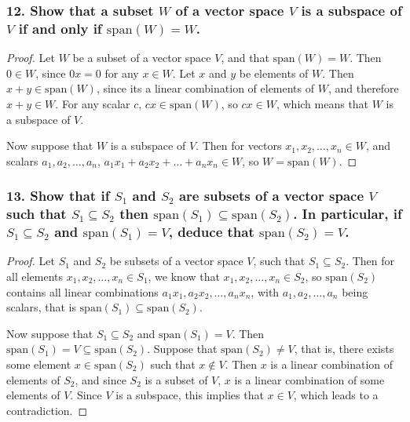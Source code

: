 \documentclass{article}
\begin{document}
\subsubsection*{12. Show that a subset $W$ of a vector space $V$ is a subspace of $V$ if and only if $\text{span}(W) = W$.}
\begin{proof}
	Let $W$ be a subset of a vector space $V$, and that $\text{span}(W) = W$. Then $0 \in W$, since $0x = 0$ for any $x \in W$. Let $x$ and $y$ be elements of $W$. Then $x + y \in \text{span}(W)$, since its a linear combination of elements of $W$, and therefore $x + y \in W$. For any scalar $c$, $cx \in \text{span}(W)$, so $cx \in W$, which means that $W$ is a subspace of $V$.

	Now suppose that $W$ is a subspace of $V$. Then for vectors $x_1, x_2, \dots, x_n \in W$, and scalars $a_1, a_2, \dots, a_n$, $a_1x_1 + a_2x_2 + \dots + a_nx_n \in W$, so $W = \text{span}(W)$.
\end{proof}

\subsubsection*{13. Show that if $S_1$ and $S_2$ are subsets of a vector space $V$ such that $S_1 \subseteq S_2$ then $\text{span}(S_1) \subseteq \text{span}(S_2)$. In particular, if $S_1 \subseteq S_2$ and $\text{span}(S_1) = V$, deduce that $\text{span}(S_2) = V$.}
\begin{proof}
	Let $S_1$ and $S_2$ be subsets of a vector space $V$, such that $S_1 \subseteq S_2$. Then for all elements $x_1, x_2, \dots, x_n \in S_1$, we know that $x_1, x_2, \dots, x_n \in S_2$, so $\text{span}(S_2)$ contains all linear combinations $a_1x_1, a_2x_2, \dots, a_nx_n$, with $a_1, a_2, \dots, a_n$ being scalars, that is $\text{span}(S_1) \subseteq \text{span}(S_2)$.

	Now suppose that $S_1 \subseteq S_2$ and $\text{span}(S_1) = V$. Then $\text{span}(S_1) = V \subseteq \text{span}(S_2)$. Suppose that $\text{span}(S_2) \ne V$, that is, there exists some element $x \in \text{span}(S_2)$ such that $x \notin V$. Then $x$ is a linear combination of elements of $S_2$, and since $S_2$ is a subset of $V$, $x$ is a linear combination of some elements of $V$. Since $V$ is a subspace, this implies that $x \in V$, which leads to a contradiction.
\end{proof}
\end{document}

